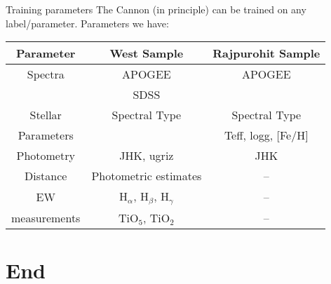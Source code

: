 \documentclass[compress]{beamer}
\begin{document}
\begin{frame}{Training parameters} 
The Cannon (in principle) can be trained on any label/parameter.
Parameters we have:
	\begin{center}
	\begin{tabular}{ |c|c|c| } 
	 \hline
	 Parameter & West Sample & Rajpurohit Sample \\ 
	 \hline
	 \hline
	 Spectra & APOGEE 	& APOGEE \\ 
	 		 & SDSS 	&  \\ 
	 \hline 
	 Stellar & Spectral Type & Spectral Type \\
	 Parameters & & Teff, logg, [Fe/H] \\
	 \hline
	 Photometry & JHK, ugriz & JHK \\
	 \hline
	 Distance   & Photometric estimates & -- \\
	 \hline
	 EW & H$_{\alpha}$, H$_{\beta}$, H$_{\gamma}$ & -- \\
	 measurements & TiO$_{5}$, TiO$_{2}$  & -- \\
	 \hline
	\end{tabular}
	\end{center}
\end{frame}


\section{End}
\end{document}
